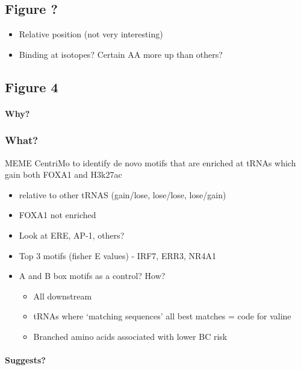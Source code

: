 \documentclass[
  12pt,
]{article}
\begin{document}
\hypertarget{figure}{%
\subsection{Figure ?}\label{figure}}

\begin{itemize}
\item
  Relative position (not very interesting)
\item
  Binding at isotopes?
  Certain AA more up than others?
\end{itemize}

\hypertarget{figure-4}{%
\subsection{Figure 4}\label{figure-4}}

\hypertarget{why-1}{%
\paragraph{Why?}\label{why-1}}

\hypertarget{what}{%
\subsubsection{What?}\label{what}}

MEME CentriMo to identify de novo motifs that are enriched at tRNAs which gain both FOXA1 and H3k27ac

\begin{itemize}
\item
  relative to other tRNAS (gain/lose, lose/lose, lose/gain)
\item
  FOXA1 not enriched
\item
  Look at ERE, AP-1, others?
\item
  Top 3 motifs (fisher E values) - IRF7, ERR3, NR4A1
\item
  A and B box motifs as a control?
  How?

  \begin{itemize}
  \item
    All downstream
  \item
    tRNAs where `matching sequences' all best matches = code for valine
  \item
    Branched amino acids associated with lower BC risk
  \end{itemize}
\end{itemize}

\hypertarget{suggests-1}{%
\paragraph{Suggests?}\label{suggests-1}}
\end{document}
